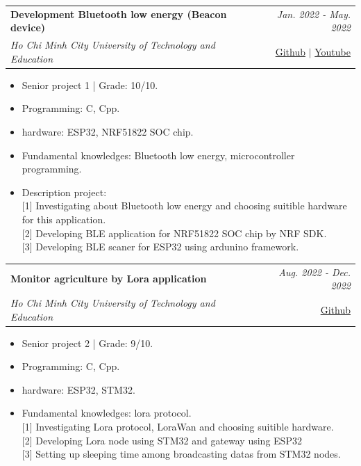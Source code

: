 \documentclass[a4paper,11pt]{article}
\makeatletter
\newcommand{\resumeProject}[4]{
\vspace{0.5mm}\item
    \begin{tabular*}{0.98\textwidth}[t]{l@{\extracolsep{\fill}}r}
        \textbf{#1} & \textit{\footnotesize{#3}} \\
        \footnotesize{\textit{#2}} & \footnotesize{#4}
    \end{tabular*}
    \vspace{-2.4mm}
}
\newcommand{\resumeItemListStart}{\begin{justify}\begin{itemize}[leftmargin=3ex, rightmargin=2ex, noitemsep,labelsep=1.2mm,itemsep=0mm]\small}
\newcommand{\resumeItemListEnd}{\end{itemize}\end{justify}\vspace{-2mm}}
\makeatother
\begin{document}
    \resumeProject
      {Development Bluetooth low energy (Beacon device)} %
      {Ho Chi Minh City University of Technology and Education} %
      {Jan. 2022 - May. 2022}
      {\href{https://github.com/Winxkin/beaconapplication}{Github} $|$ \href{https://www.youtube.com/watch?v=Auvf9YhzOnM}{Youtube}}
      \resumeItemListStart
        \item {Senior project 1 | Grade: 10/10.}
        \item {Programming: C, Cpp.}
        \item {hardware: ESP32, NRF51822 SOC chip.}
        \item {Fundamental knowledges: Bluetooth low energy, microcontroller programming.}
        \item {Description project:}\hfill
        \\ {[1] Investigating about Bluetooth low energy and choosing suitible hardware for this application.}
        \\ {[2] Developing BLE application for NRF51822 SOC chip by NRF SDK.}
        \\ {[3] Developing BLE scaner for ESP32 using ardunino framework.}
    \resumeItemListEnd

    \resumeProject
      {Monitor agriculture by Lora application}%
      {Ho Chi Minh City University of Technology and Education}%
      {Aug. 2022 - Dec. 2022}
      {\href{https://github.com/Winxkin/monitor_agriculture}{Github}}
      \resumeItemListStart
        \item {Senior project 2 | Grade: 9/10.}
        \item {Programming: C, Cpp.}
        \item {hardware: ESP32, STM32.}
        \item {Fundamental knowledges: lora protocol.}\hfill
        \\ {[1] Investigating Lora protocol, LoraWan and choosing suitible hardware.}
        \\ {[2] Developing Lora node using STM32 and gateway using ESP32}
        \\ {[3] Setting up sleeping time among broadcasting datas from STM32 nodes.}
    \resumeItemListEnd
\end{document}

